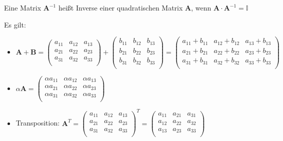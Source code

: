 \begin{frameddefn}
	Eine Matrix $\mathbf{A}^{-1}$ heißt Inverse einer quadratischen Matrix $\mathbf{A}$, wenn $\mathbf{A} \cdot \mathbf{A}^{-1} = \mathbb{I}$
\end{frameddefn}

Es gilt:
\begin{itemize}
	\item $\mathbf{A} + \mathbf{B} = 
	\left(\begin{array}{rrr} 
		a_{11} & a_{12} & a_{13} \\ 
		a_{21} & a_{22} & a_{23} \\ 
		a_{31} & a_{32} & a_{33} \\ 
	\end{array}\right) +
	\left(\begin{array}{rrr} 
		b_{11} & b_{12} & b_{13} \\ 
		b_{21} & b_{22} & b_{23} \\ 
		b_{31} & b_{32} & b_{33} \\ 
	\end{array}\right) = 
	\left(\begin{array}{rrr} 
		a_{11} + b_{11} & a_{12} + b_{12} & a_{13} + b_{13} \\ 
		a_{21} + b_{21} & a_{22} + b_{22} & a_{23} + b_{23} \\ 
		a_{31} + b_{31} & a_{32} + b_{32} & a_{33} + b_{33} \\ 
	\end{array}\right)$

	\item $\alpha \mathbf{A} = \left(\begin{array}{rrr} 
		\alpha a_{11} & \alpha a_{12} & \alpha a_{13} \\ 
		\alpha a_{21} & \alpha a_{22} & \alpha a_{23} \\ 
		\alpha a_{31} & \alpha a_{32} & \alpha a_{33} \\ 
	\end{array}\right)$

	\item Transposition: $\mathbf{A}^T = 
	\left(\begin{array}{rrr} 
		a_{11} & a_{12} & a_{13} \\ 
		a_{21} & a_{22} & a_{23} \\ 
		a_{31} & a_{32} & a_{33} \\ 
	\end{array}\right)^T = 
	\left(\begin{array}{rrr} 
		a_{11} & a_{21} & a_{31} \\ 
		a_{12} & a_{22} & a_{32} \\ 
		a_{13} & a_{23} & a_{33} \\ 
	\end{array}\right)$


\end{itemize}
